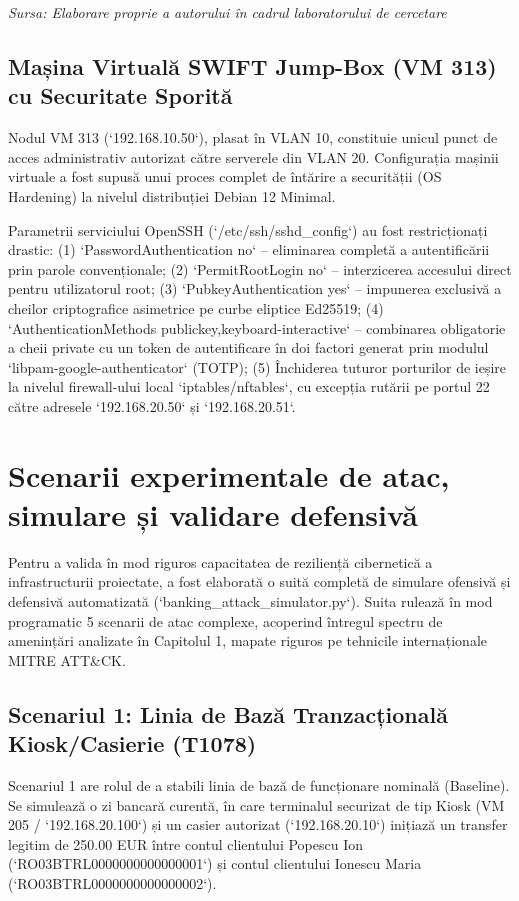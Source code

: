 \textit{Sursa: Elaborare proprie a autorului în cadrul laboratorului de cercetare}

\subsection{Mașina Virtuală SWIFT Jump-Box (VM 313) cu Securitate Sporită}

Nodul VM 313 (`192.168.10.50`), plasat în VLAN 10, constituie unicul punct de acces administrativ autorizat către serverele din VLAN 20. Configurația mașinii virtuale a fost supusă unui proces complet de întărire a securității (OS Hardening) la nivelul distribuției Debian 12 Minimal.

Parametrii serviciului OpenSSH (`/etc/ssh/sshd\_config`) au fost restricționați drastic: (1) `PasswordAuthentication no` – eliminarea completă a autentificării prin parole convenționale; (2) `PermitRootLogin no` – interzicerea accesului direct pentru utilizatorul root; (3) `PubkeyAuthentication yes` – impunerea exclusivă a cheilor criptografice asimetrice pe curbe eliptice Ed25519; (4) `AuthenticationMethods publickey,keyboard-interactive` – combinarea obligatorie a cheii private cu un token de autentificare în doi factori generat prin modulul `libpam-google-authenticator` (TOTP); (5) Închiderea tuturor porturilor de ieșire la nivelul firewall-ului local `iptables/nftables`, cu excepția rutării pe portul 22 către adresele `192.168.20.50` și `192.168.20.51`.

\section{Scenarii experimentale de atac, simulare și validare defensivă}

Pentru a valida în mod riguros capacitatea de reziliență cibernetică a infrastructurii proiectate, a fost elaborată o suită completă de simulare ofensivă și defensivă automatizată (`banking\_attack\_simulator.py`). Suita rulează în mod programatic 5 scenarii de atac complexe, acoperind întregul spectru de amenințări analizate în Capitolul 1, mapate riguros pe tehnicile internaționale MITRE ATT\&CK.

\subsection{Scenariul 1: Linia de Bază Tranzacțională Kiosk/Casierie (T1078)}

Scenariul 1 are rolul de a stabili linia de bază de funcționare nominală (Baseline). Se simulează o zi bancară curentă, în care terminalul securizat de tip Kiosk (VM 205 / `192.168.20.100`) și un casier autorizat (`192.168.20.10`) inițiază un transfer legitim de 250.00 EUR între contul clientului Popescu Ion (`RO03BTRL0000000000000001`) și contul clientului Ionescu Maria (`RO03BTRL0000000000000002`).

